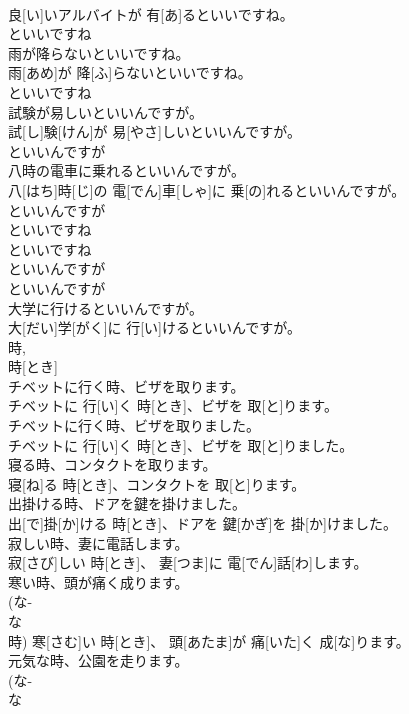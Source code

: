 \documentclass[8pt]{extreport}
\begin{document}
\begin{CJK}{UTF8}{min}
\\	良[い]いアルバイトが 有[あ]るといいですね。 
\\	といいですね 
\\	雨が降らないといいですね。	
\\	雨[あめ]が 降[ふ]らないといいですね。 
\\	といいですね 
\\	試験が易しいといいんですが。	
\\	試[し]験[けん]が 易[やさ]しいといいんですが。 
\\	といいんですが 
\\	八時の電車に乗れるといいんですが。	
\\	八[はち]時[じ]の 電[でん]車[しゃ]に 乗[の]れるといいんですが。 
\\	といいんですが 
\\	といいですね	
\\	といいですね
\\	といいんですが	
\\	といいんですが
\\	大学に行けるといいんですが。	
\\	大[だい]学[がく]に 行[い]けるといいんですが。
\\	時, 
\\	時[とき] 
\\	チベットに行く時、ビザを取ります。	
\\	チベットに 行[い]く 時[とき]、ビザを 取[と]ります。
\\	チベットに行く時、ビザを取りました。	
\\	チベットに 行[い]く 時[とき]、ビザを 取[と]りました。
\\	寝る時、コンタクトを取ります。	
\\	寝[ね]る 時[とき]、コンタクトを 取[と]ります。
\\	出掛ける時、ドアを鍵を掛けました。	
\\	出[で]掛[か]ける 時[とき]、ドアを 鍵[かぎ]を 掛[か]けました。
\\	寂しい時、妻に電話します。	
\\	寂[さび]しい 時[とき]、 妻[つま]に 電[でん]話[わ]します。
\\	寒い時、頭が痛く成ります。	
\\	(な-
\\	な 
\\	時)	寒[さむ]い 時[とき]、 頭[あたま]が 痛[いた]く 成[な]ります。
\\	元気な時、公園を走ります。	
\\	(な-
\\	な 

\end{CJK}
\end{document}
